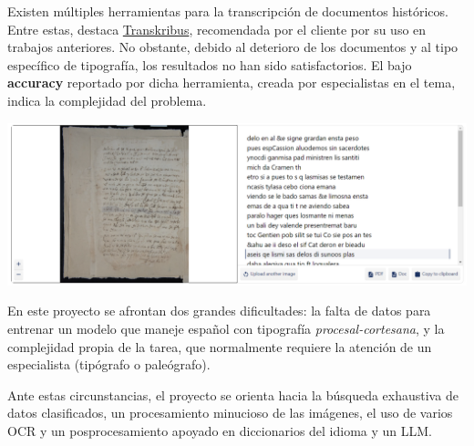 \documentclass[11pt,a4paper]{article}
\begin{document}
Existen múltiples herramientas para la transcripción de documentos históricos. Entre estas, destaca \href{https://www.transkribus.org/}{Transkribus}, recomendada por el cliente por su uso en trabajos anteriores. No obstante, debido al deterioro de los documentos y al tipo específico de tipografía, los resultados no han sido satisfactorios. El bajo \textbf{accuracy} reportado por dicha herramienta, creada por especialistas en el tema, indica la complejidad del problema.

\begin{center} 
\includegraphics[width=1.0\textwidth]{transkribus} 
\end{center}

En este proyecto se afrontan dos grandes dificultades: la falta de datos para entrenar un modelo que maneje español con tipografía \textit{procesal-cortesana}, y la complejidad propia de la tarea, que normalmente requiere la atención de un especialista (tipógrafo o paleógrafo).

Ante estas circunstancias, el proyecto se orienta hacia la búsqueda exhaustiva de datos clasificados, un procesamiento minucioso de las imágenes, el uso de varios OCR y un posprocesamiento apoyado en diccionarios del idioma y un LLM.
\end{document}
